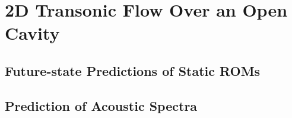 \section{2D Transonic Flow Over an Open Cavity}

\subsection{Future-state Predictions of Static ROMs}

\subsection{Prediction of Acoustic Spectra}
